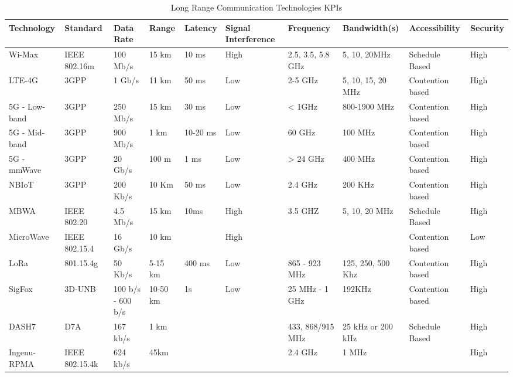 \begin{table}[ht!]
  \centering
  \caption{Long Range Communication Technologies \acrshort{KPI}s}
  \label{tab:long-range-com}
  \begin{tabular}{p{} p{1cm} p{1cm} p{1cm} p{1cm} p{1.5cm} p{1.2cm} p{1.3cm} p{1.4cm} p{1.4cm}}
    \hline
    Technology & Standard & Data Rate & Range  & Latency & Signal Interference  & Frequency & Bandwidth(s) & Accessibility & Security\\
    \hline
    Wi-Max &  IEEE 802.16m &100 Mb/s	& 15 km&  10 ms  & High & 2.5, 3.5, 5.8 GHz	 & 5, 10, 20MHz & Schedule Based&	High\\
    
    LTE-4G & 3GPP &1 Gb/s	&  11 km &  50 ms  & Low & 2-5 GHz	 &  5, 10, 15, 20 MHz	 &Contention based&	High\\
  
    5G - Low-band & 3GPP &250 Mb/s	&  15 km &  30 ms  & Low & < 1GHz	 &  800-1900 MHz	 &Contention based&	High\\
  
    5G - Mid-band & 3GPP &900 Mb/s	&  1 km &  10-20 ms  & Low & 60 GHz	 &  100 MHz	 &Contention based&	High\\

    5G - mmWave & 3GPP &20 Gb/s	&  100 m &  1 ms  & Low & > 24 GHz	 &  400 MHz	 &Contention based&	High\\

    NBIoT & 3GPP &200 Kb/s	&  10 Km &  50 ms  & Low &  2.4 GHz	 &  200 KHz	 &Contention based&	High\\

    MBWA & IEEE 802.20 &4.5 Mb/s	&  15 km &10ms & High & 3.5 GHZ 	 & 5, 10, 20 MHz  	 &Schedule Based&	High\\

    MicroWave & IEEE 802.15.4 &16 Gb/s	&  10 km &   & High & 	 &  	 &Contention based&	Low\\

    LoRa  &801.15.4g&50 Kb/s	&  5-15 km & 400 ms  & Low & 865 - 923 MHz	 & 125, 250, 500 Khz 	 & Contention based&High	\\

    SigFox  &3D-UNB &100 b/s - 600 b/s	&  10-50 km & 1s  & Low & 25 MHz - 1 GHz	 &  192KHz &Contention based&High	\\
   
    DASH7  &D7A &167 kb/s&  1 km &   &  & 433, 868/915 MHz	 &  25 kHz or 200 kHz	 &Schedule Based& High	\\

    Ingenu-RPMA  & IEEE 802.15.4k&624 kb/s&  45km &   &  & 2.4 GHz	 & 1 MHz 	 &&High	\\
    \hline
  \end{tabular}
\end{table}

